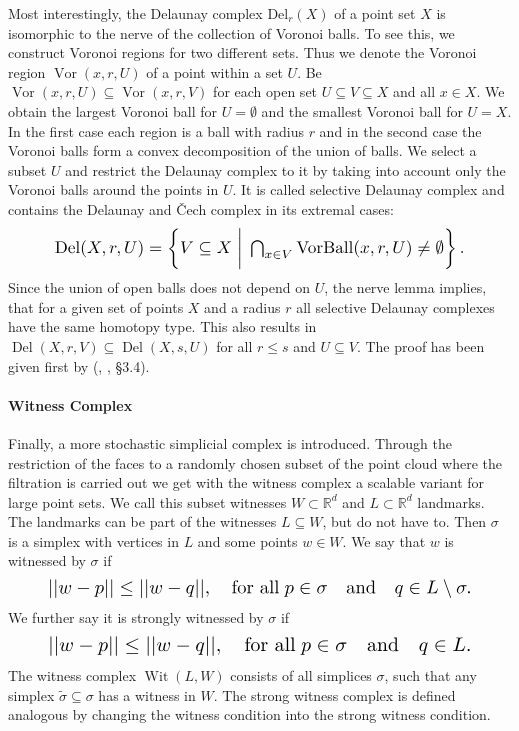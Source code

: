 \documentclass{article}
\DeclareMathOperator{\VorBall}{\text{VorBall}}
\DeclareMathOperator{\Vor}{\text{Vor}}
\DeclareMathOperator{\Del}{\text{Del}}
\DeclareMathOperator{\Wit}{\text{Wit}}
\begin{document}
Most interestingly, the Delaunay complex $\text{Del}_r(X)$ of a point set $X$ is isomorphic to the nerve of the collection of Voronoi balls. To see this, we construct Voronoi regions for two different sets. Thus we denote the Voronoi region $\Vor(x,r,U)$ of a point within a set $U$. Be $\Vor(x,r,U) \subseteq \Vor(x,r,V)$ for each open set $U \subseteq V \subseteq X$ and all $x \in X$. We obtain the largest Voronoi ball for $U = \emptyset$ and the smallest Voronoi ball for $U = X$. In the first case each region is a ball with radius $r$ and in the second case the Voronoi balls form a convex decomposition of the union of balls. We select a subset $U$ and restrict the Delaunay complex to it by taking into account only the Voronoi balls around the points in $U$. It is called selective Delaunay complex and contains the Delaunay and \v{Cech} complex in its extremal cases:
\begin{equation}
\resizebox{0.85\columnwidth}{!}
{$\Del(X,r,U) = \left\{V \subseteq X \; \bigg\vert \; \bigcap_{x \in V} \VorBall(x,r,U) \neq \emptyset \right\}.$}
\end{equation}
Since the union of open balls does not depend on $U$, the nerve lemma implies, that for a given set of points $X$ and a radius $r$ all selective Delaunay complexes have the same homotopy type. This also results in $\Del(X,r,V) \subseteq \Del(X,s,U)$ for all $r \leq s$ and $U \subseteq V$. The proof has been given first by (\citeauthor{bauer2017morse}, \citeyear{bauer2017morse}, §3.4).

\paragraph{Witness Complex} Finally, a more stochastic simplicial complex is introduced. Through the restriction of the faces to a randomly chosen subset of the point cloud where the filtration is carried out we get with the witness complex a scalable variant for large point sets. We call this subset witnesses $W \subset \mathbb{R}^d$ and $L \subset \mathbb{R}^d$ landmarks. The landmarks can be part of the witnesses $L \subseteq W$, but do not have to. Then $\sigma$ is a simplex with vertices in $L$ and some points $w \in W$. We say that $w$ is witnessed by $\sigma$ if
\begin{equation}
\resizebox{0.88\columnwidth}{!}
{$||w-p|| \leq ||w-q||, \quad \text{for all} \; p \in \sigma \quad \text{and} \quad q \in L \setminus \sigma.$}
\end{equation}
We further say it is strongly witnessed by $\sigma$ if
\begin{equation}
\resizebox{0.88\columnwidth}{!}
{$||w-p|| \leq ||w-q||, \quad \text{for all} \; p \in \sigma \quad \text{and} \quad q \in L.$}
\end{equation}
The witness complex $\Wit(L,W)$ consists of all simplices $\sigma$, such that any simplex $\tilde{\sigma} \subseteq \sigma$ has a witness in $W$. The strong witness complex is defined analogous by changing the witness condition into the strong witness condition.
\end{document}
